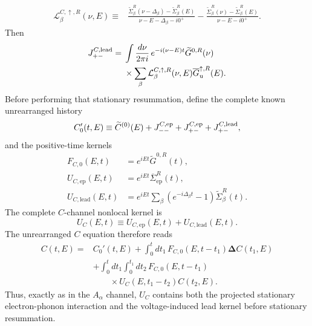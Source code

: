 \documentclass[
 reprint,
 superscriptaddress,
 amsmath,amssymb,
 aps,prb,
 longbibliography,
 floatfix
]{revtex4-2}
\newcommand{\ep}{\mathrm{ep}}
\newcommand{\lead}{\mathrm{lead}}
\newcommand{\barSigma}{\overline{\Sigma}}
\begin{document}
\begin{equation*}
\begin{aligned}
\mathcal L_\beta^{C,\uparrow,R}(\nu,E)
\equiv{}&
\frac{
\widetilde\Sigma_\beta^R(\nu-\Delta_\beta)
-
\widetilde\Sigma_\beta^R(E)}
{\nu-E-\Delta_\beta-i0^+}
-
\frac{
\widetilde\Sigma_\beta^R(\nu)
-
\widetilde\Sigma_\beta^R(E)}
{\nu-E-i0^+}.
\end{aligned}
\end{equation*}
Then
\begin{equation*}
\begin{aligned}
J_{+-}^{C,\rm lead}
={}&
\int\frac{d\nu}{2\pi i}\,
e^{-i(\nu-E)t}
\widetilde G^{0,R}(\nu)
\\
&\times
\sum_\beta
\mathcal L_\beta^{C,\uparrow,R}(\nu,E)
\overline G_{\mathrm u}^{\uparrow,R}(E).
\end{aligned}
\end{equation*}
Before performing that stationary resummation, define the complete known unrearranged history
\begin{equation*}
C_0'(t,E)
\equiv
\widetilde C^{(0)}(E)
+J_{--}^{C,\ep}
+J_{+-}^{C,\ep}
+J_{+-}^{C,\rm lead},
\end{equation*}
and the positive-time kernels
\begin{align*}
F_{C,0}(E,t)
&=
e^{iEt}\widetilde G^{0,R}(t),
\\
U_{C,\ep}(E,t)
&=
e^{iEt}\barSigma_{\ep}^R(t),
\\
U_{C,\lead}(E,t)
&=
e^{iEt}
\sum_\beta
\left(e^{-i\Delta_\beta t}-1\right)
\widetilde\Sigma_\beta^R(t).
\end{align*}
The complete $C$-channel nonlocal kernel is
\begin{equation}
U_C(E,t)
\equiv
U_{C,\ep}(E,t)
+
U_{C,\lead}(E,t).
\label{eq:UCtotal-up-proof}
\end{equation}
The unrearranged $C$ equation therefore reads
\begin{equation*}
\begin{aligned}
C(t,E)
={}&
C_0'(t,E)
+
\int_0^t dt_1\,
F_{C,0}(E,t-t_1)
\bm\Delta
C(t_1,E)
\\
&+
\int_0^t dt_1
\int_0^{t_1}dt_2\,
F_{C,0}(E,t-t_1)
\\
&\qquad\times
U_C(E,t_1-t_2)
C(t_2,E).
\end{aligned}
\end{equation*}
Thus, exactly as in the $A_\alpha$ channel, $U_C$ contains both the projected stationary electron-phonon interaction and the voltage-induced lead kernel before stationary resummation.
\end{document}
